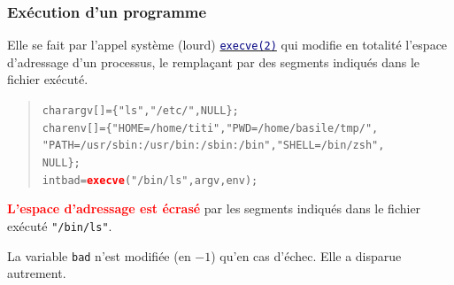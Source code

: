 \documentclass[lualatex,11pt,a4paper,svgnames,french]{beamer}
\newcommand{\clbrougras}[1]{{\textcolor{Red}{\textbf{#1}}}}
\begin{document}
\begin{frame}\frametitle{Exécution d'un programme}
  Elle se fait par l'appel système (lourd)
  {\href{https://man7.org/linux/man-pages/man2/execve.2.html}{\texttt{\textcolor{Navy}{execve(2)}}}}
  qui modifie en totalité l'espace d'adressage d'un processus, le remplaçant par des segments indiqués dans le fichier exécuté.

  \begin{relsize}{-0.5}
  \begin{quote}
    \begin{alltt}
      char argv[] = \{ "ls", "/etc/", NULL \};\\
      char env[] = \{ "HOME=/home/titi", "PWD=/home/basile/tmp/",\\
      "PATH=/usr/sbin:/usr/bin:/sbin:/bin", "SHELL=/bin/zsh", \\   NULL \};\\
      int bad = \clbrougras{execve}("/bin/ls", argv, env);
    \end{alltt}
  \end{quote}
  \end{relsize}

  \clbrougras{L'espace d'adressage est écrasé} par les segments indiqués dans le fichier exécuté \texttt{"/bin/ls"}.

  La variable \texttt{bad} n'est modifiée (en $-1$) qu'en cas d'échec. Elle a disparue autrement.
\end{frame}

\end{document}
